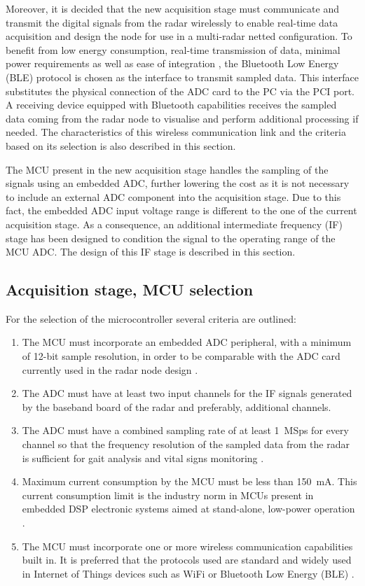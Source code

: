 Moreover, it is decided that the new acquisition stage must communicate and transmit the digital signals from the radar wirelessly to enable real-time data acquisition and design the node for use in a multi-radar netted configuration. To benefit from low energy consumption, real-time transmission of data, minimal power requirements as well as ease of integration \cite{Gomez2012}, the Bluetooth Low Energy (BLE) protocol is chosen as the interface to transmit sampled data. This interface substitutes the physical connection of the ADC card to the PC via the PCI port. A receiving device equipped with Bluetooth capabilities receives the sampled data coming from the radar node to visualise and perform additional processing if needed. The characteristics of this wireless communication link and the criteria based on its selection is also described in this section.

The MCU present in the new acquisition stage handles the sampling of the signals using an embedded ADC, further lowering the cost as it is not necessary to include an external ADC component into the acquisition stage. Due to this fact, the embedded ADC input voltage range is different to the one of the current acquisition stage. As a consequence, an additional intermediate frequency (IF) stage has been designed to condition the signal to the operating range of the MCU ADC. The design of this IF stage is described in this section.

\subsection{Acquisition stage, MCU selection} \label{sec:mcu_selection}

For the selection of the microcontroller several criteria are outlined:
\begin{enumerate}
	\item The MCU must incorporate an embedded ADC peripheral, with a minimum of 12-bit sample resolution, in order to be comparable with the ADC card currently used in the radar node design \cite{Sardinero2022, ADLINKTechnologies2010}.
	\item The ADC must have at least two input channels for the IF signals generated by the baseband board of the radar and preferably, additional channels.
	\item The ADC must have a combined sampling rate of at least \SI{1}{MSps} for every channel so that the frequency resolution of the sampled data from the radar is sufficient for gait analysis and vital signs monitoring \cite{Antolinos2020, Sardinero2022}.
	\item Maximum current consumption by the MCU must be less than \SI{150}{\milli\ampere}. This current consumption limit is the industry norm in MCUs present in embedded DSP electronic systems aimed at stand-alone, low-power operation \cite{Benini2001}.
	\item The MCU must incorporate one or more wireless communication capabilities built in. It is preferred that the protocols used are standard and widely used in Internet of Things devices such as WiFi or Bluetooth Low Energy (BLE) \cite{AlSarawi2017}.
\end{enumerate}

